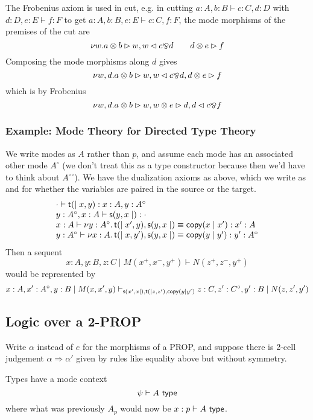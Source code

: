 \documentclass{article}
\newcommand\deq{\ensuremath{\equiv}}
\newcommand\spr{\ensuremath{\Rightarrow}} %
\newcommand\wftype[2]{\ensuremath{#1 \vdash #2 \,\, \dsd{type}}}
\begin{document}
The Frobenius axiom is used in cut, e.g. in cutting $a:A,b:B \vdash
c:C,d:D$ with $d:D,e:E \vdash f:F$ to get $a:A,b:B,e:E \vdash c:C,f:F$,
the mode morphisms of the premises of the cut are
\[
\nu w. a \otimes b \rhd w, w \lhd c \bindnasrepma d  \qquad d \otimes e \rhd f
\]
Composing the mode morphisms along $d$ gives
\[
\nu w,d. a \otimes b \rhd w, w \lhd c \bindnasrepma d, d \otimes e \rhd f
\]
which is by Frobenius
\[
\nu w,d. a \otimes b \rhd w, w \otimes e \rhd d, d \lhd c \bindnasrepma f
\]

\subsubsection{Example: Mode Theory for Directed Type Theory}

\newcommand{\dualm}[1]{\ensuremath{#1^{\mathord{\circ}}}}

We write modes as $A$ rather than $p$, and assume each mode has an
associated other mode $\dualm A$ (we don't treat this as a type
constructor because then we'd have to think about $\dualm {{\dualm A}}$).
We have the dualization axioms as above, which we write as  and
 for whether the variables are paired in the source or the
target.  
\[
\begin{array}{l}
\tseq{\cdot}{\const{t}{}{x,y}}{x:A,y:\dualm A}\\
\tseq{y:\dualm A,x:A}{\const{s}{y,x}{}}{\cdot}\\
\tseq{x:A}{\cut{y:\dualm A}{\const{t}{}{x',y},{\const{s}{y,x}{}} \deq \cpy{x}{x'} }}{x':A} \\
\tseq{y:\dualm A}{\cut{x:A}{\const{t}{}{x,y'},{\const{s}{y,x}{}} \deq \cpy{y}{y'} }}{y':\dualm A} \\
\end{array}
\]
Then a sequent 
\[
x:A,y:B,z:C \mid M(x^+,x^-,y^+) \vdash N(z^+,z^-,y^+)
\]
would be represented by 
\[
x:A, x':\dualm{A}, y:B \mid M(x,x',y) \vdash_{\const{s}{x',x}{},\const{t}{}{z,z'},\cpy{y}{y'}} z:C, z':\dualm{C}, y':B \mid N(z,z',y')
\]

\subsection{Logic over a 2-PROP}

Write $\alpha$ instead of $e$ for the morphisms of a PROP, and suppose
there is 2-cell judgement $\alpha \spr \alpha'$ given by rules like
equality above but without symmetry.

Types have a mode context
\[
\wftype{\psi}{A}
\]
where what was previously $A_p$ would now be $\wftype{x:p}{A}$.  
\end{document}
